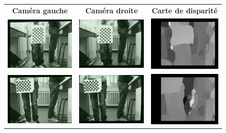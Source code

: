 \documentclass{article}
\begin{document}
\begin{figure}
    \begin{center}
        \begin{tabular}{ccc}
            \textbf{Caméra gauche} & \textbf{Caméra droite} & \textbf{Carte de disparité} \\
            \includegraphics[width=0.3\linewidth]{rcs/rem0l.png} & \includegraphics[width=0.3\linewidth]{rcs/rem0r.png} & \includegraphics[width=0.3\linewidth]{rcs/disp0.png} \\
            \includegraphics[width=0.3\linewidth]{rcs/rem1l.png} & \includegraphics[width=0.3\linewidth]{rcs/rem1r.png} & \includegraphics[width=0.3\linewidth]{rcs/disp1.png} \\

\end{tabular}
\end{center}
\end{figure}
\end{document}
